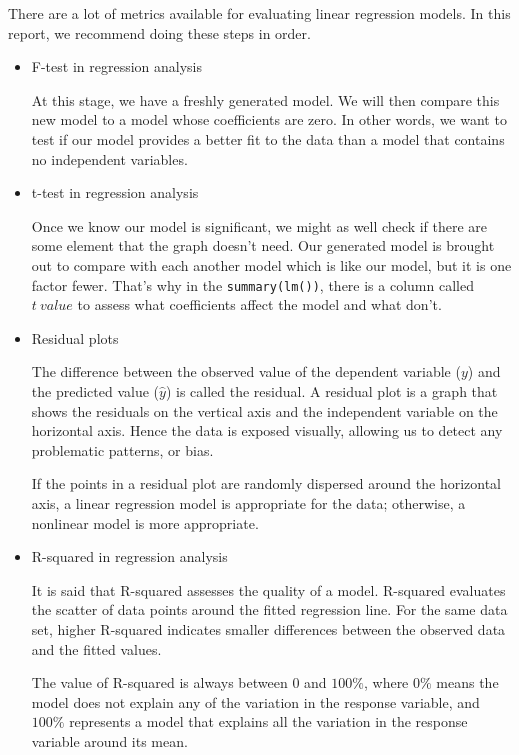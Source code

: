 \documentclass[a4paper]{article}
\numberwithin{equation}{section}
\begin{document}
There are a lot of metrics available for evaluating linear regression models.
In this report, we recommend doing these steps in order.
\begin{itemize}
  \item F-test in regression analysis

        At this stage, we have a freshly generated model.
        We will then compare this new model to a model whose coefficients are zero.
        In other words, we want to test if our model provides a better fit to the data than a model that contains no independent variables.

  \item t-test in regression analysis

        Once we know our model is significant, we might as well check if there are some element that the graph doesn't need.
        Our generated model is brought out to compare with each another model which is like our model, but it is one factor fewer.
        That's why in the \texttt{summary(lm())}, there is a column called \(t\ value\) to assess what coefficients affect the model and what don't.

  \item Residual plots

        The difference between the observed value of the dependent variable (\(y\)) and the predicted value (\(\hat{y}\)) is called the residual.
        A residual plot is a graph that shows the residuals on the vertical axis and the independent variable on the horizontal axis.
        Hence the data is exposed visually, allowing us to detect any problematic patterns, or bias.

        If the points in a residual plot are randomly dispersed around the horizontal axis, a linear regression model is appropriate for the data; otherwise, a nonlinear model is more appropriate.

  \item R-squared in regression analysis

        It is said that R-squared assesses the quality of a model.
        R-squared evaluates the scatter of data points around the fitted regression line.
        For the same data set, higher R-squared indicates smaller differences between the observed data and the fitted values.

        The value of R-squared is always between \(0\) and \(100\% \), where \(0\% \) means the model does not explain any of the variation in the response variable, and \(100\% \) represents a model that explains all the variation in the response variable around its mean.


\end{itemize}
\end{document}
